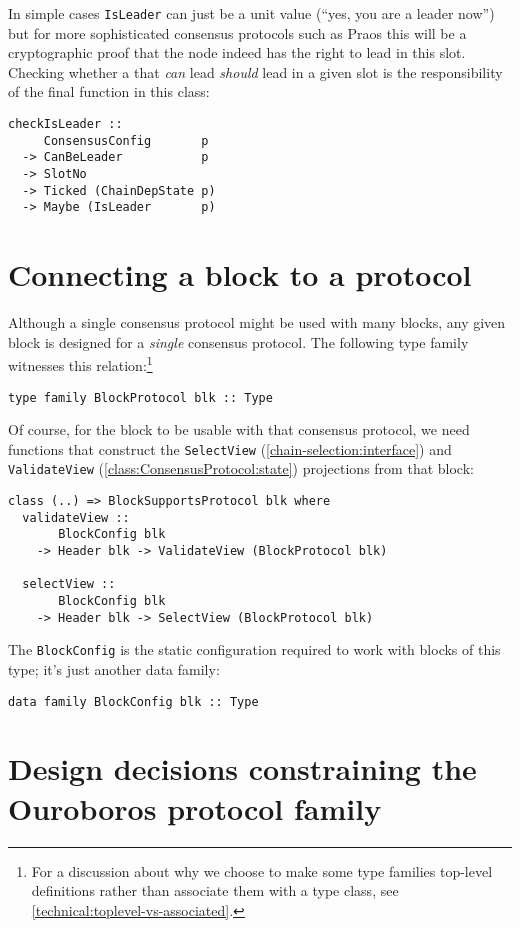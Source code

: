 In simple cases \lstinline!IsLeader! can just be a unit value (``yes, you are a
leader now'') but for more sophisticated consensus protocols such as Praos this
will be a cryptographic proof that the node indeed has the right to lead in this
slot. Checking whether a that \emph{can} lead \emph{should} lead in a given slot
is the responsibility of the final function in this class:

\begin{lstlisting}
checkIsLeader ::
     ConsensusConfig       p
  -> CanBeLeader           p
  -> SlotNo
  -> Ticked (ChainDepState p)
  -> Maybe (IsLeader       p)
\end{lstlisting}

\section{Connecting a block to a protocol}
\label{BlockSupportsProtocol}

Although a single consensus protocol might be used with many blocks, any given
block is designed for a \emph{single} consensus protocol. The following type
family witnesses this relation:\footnote{For a discussion about why we
choose to make some type families top-level definitions rather than associate
them with a type class, see \cref{technical:toplevel-vs-associated}.}
%
\begin{lstlisting}
type family BlockProtocol blk :: Type
\end{lstlisting}
%
Of course, for the block to be usable with that consensus protocol, we need
functions that construct the \lstinline!SelectView!
(\cref{chain-selection:interface}) and \lstinline!ValidateView!
(\cref{class:ConsensusProtocol:state}) projections from that block:
%
\begin{lstlisting}
class (..) => BlockSupportsProtocol blk where
  validateView ::
       BlockConfig blk
    -> Header blk -> ValidateView (BlockProtocol blk)

  selectView ::
       BlockConfig blk
    -> Header blk -> SelectView (BlockProtocol blk)
\end{lstlisting}
The \lstinline!BlockConfig! is the static configuration required to work with
blocks of this type; it's just another data family:
%
\begin{lstlisting}
data family BlockConfig blk :: Type
\end{lstlisting}

\section{Design decisions constraining the Ouroboros protocol family}
\label{design-decisions-constraining-ouroboros}

